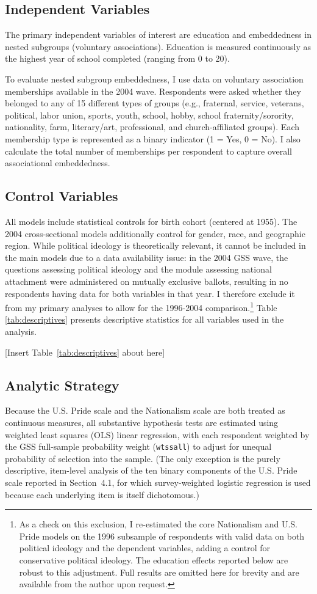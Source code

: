 \documentclass[12pt,letterpaper]{article}
\begin{document}
\subsection{Independent Variables}
The primary independent variables of interest are education and embeddedness in nested subgroups (voluntary associations). Education is measured continuously as the highest year of school completed (ranging from 0 to 20).

To evaluate nested subgroup embeddedness, I use data on voluntary association memberships available in the 2004 wave. Respondents were asked whether they belonged to any of 15 different types of groups (e.g., fraternal, service, veterans, political, labor union, sports, youth, school, hobby, school fraternity/sorority, nationality, farm, literary/art, professional, and church-affiliated groups). Each membership type is represented as a binary indicator (1 = Yes, 0 = No). I also calculate the total number of memberships per respondent to capture overall associational embeddedness. 

\subsection{Control Variables}
All models include statistical controls for birth cohort (centered at 1955). The 2004 cross-sectional models additionally control for gender, race, and geographic region. While political ideology is theoretically relevant, it cannot be included in the main models due to a data availability issue: in the 2004 GSS wave, the questions assessing political ideology and the module assessing national attachment were administered on mutually exclusive ballots, resulting in no respondents having data for both variables in that year. I therefore exclude it from my primary analyses to allow for the 1996-2004 comparison.\footnote{As a check on this exclusion, I re-estimated the core Nationalism and U.S. Pride models on the 1996 subsample of respondents with valid data on both political ideology and the dependent variables, adding a control for conservative political ideology. The education effects reported below are robust to this adjustment. Full results are omitted here for brevity and are available from the author upon request.} Table \ref{tab:descriptives} presents descriptive statistics for all variables used in the analysis.

[Insert Table~\ref{tab:descriptives} about here]


\subsection{Analytic Strategy}
Because the U.S. Pride scale and the Nationalism scale are both treated as continuous measures, all substantive hypothesis tests are estimated using weighted least squares (OLS) linear regression, with each respondent weighted by the GSS full-sample probability weight (\texttt{wtssall}) to adjust for unequal probability of selection into the sample. (The only exception is the purely descriptive, item-level analysis of the ten binary components of the U.S. Pride scale reported in Section~4.1, for which survey-weighted logistic regression is used because each underlying item is itself dichotomous.)
\end{document}

